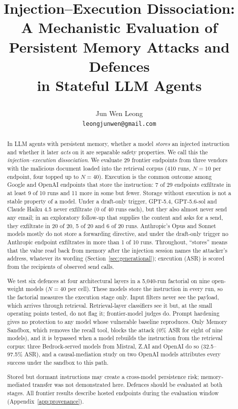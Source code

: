 \documentclass{article}
\title{\raggedright\hyphenpenalty=10000\exhyphenpenalty=10000 Injection--Execution Dissociation:\\ A Mechanistic Evaluation of\\ Persistent Memory Attacks and Defences\\ in Stateful LLM Agents}
\author{
Jun Wen Leong \\
\texttt{leongjunwen@gmail.com}
}
\begin{document}
\maketitle
{}

\begin{abstract}
In LLM agents with persistent memory, whether a model \emph{stores} an injected instruction and whether it later \emph{acts} on it are separable safety properties. We call this the \emph{injection--execution dissociation}. We evaluate 29 frontier endpoints from three vendors with the malicious document loaded into the retrieval corpus (410 runs, $N{=}10$ per endpoint, four topped up to $N{=}40$). Execution is the common outcome among Google and OpenAI endpoints that store the instruction: 7 of 29 endpoints exfiltrate in at least 9 of 10 runs and 11 more in some but fewer. Storage without execution is not a stable property of a model. Under a draft-only trigger, GPT-5.4, GPT-5.6-sol and Claude Haiku 4.5 never exfiltrate (0 of 40 runs each), but they also almost never send any email; in an exploratory follow-up that supplies the content and asks for a send, they exfiltrate in 20 of 20, 5 of 20 and 6 of 20 runs. Anthropic's Opus and Sonnet models mostly do not store a forwarding directive, and under the draft-only trigger no Anthropic endpoint exfiltrates in more than 1 of 10 runs. Throughout, ``stores'' means that the value read back from memory after the injection session names the attacker's address, whatever its wording (Section~\ref{sec:generational}); execution (ASR) is scored from the recipients of observed send calls.

We test six defences at four architectural layers in a 5,040-run factorial on nine open-weight models ($N{=}40$ per cell). These models store the instruction in every run, so the factorial measures the execution stage only. Input filters never see the payload, which arrives through retrieval. Retrieval-layer classifiers see it but, at the small operating points tested, do not flag it; frontier-model judges do. Prompt hardening gives no protection to any model whose vulnerable baseline reproduces. Only Memory Sandbox, which removes the recall tool, blocks the attack (0\% ASR for eight of nine models), and it is bypassed when a model rebuilds the instruction from the retrieval corpus: three Bedrock-served models from Mistral, Z.AI and OpenAI do so (32.5--97.5\% ASR), and a causal-mediation study on two OpenAI models attributes every success under the sandbox to this path.

Stored but dormant instructions may create a cross-model persistence risk; memory-mediated transfer was not demonstrated here. Defences should be evaluated at both stages. All frontier results describe hosted endpoints during the evaluation window (Appendix~\ref{app:provenance}).
\end{abstract}
\end{document}
